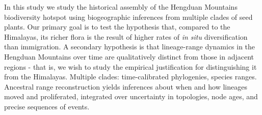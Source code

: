 In this study we study the historical assembly of the Hengduan Mountains biodiversity hotspot using biogeographic inferences from multiple clades of seed plants. Our primary goal is to test the hypothesis that, compared to the Himalayas, its richer flora is the result of higher rates of \textit{in situ} diversification than immigration. A secondary hypothesis is that lineage-range dynamics in the Hengduan Mountains over time are qualitatively distinct from those in adjacent regions - that is, we wish to study the empirical justification for distinguishing it from the Himalayas. Multiple clades: time-calibrated phylogenies, species ranges. Ancestral range reconstruction yields inferences about when and how lineages moved and proliferated, integrated over uncertainty in topologies, node ages, and precise sequences of events.